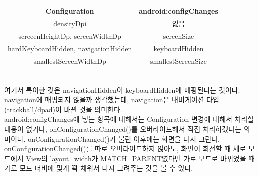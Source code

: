 \begin{tabular}{|c|c|}\hline
Configuration & android:configChanges \\ \hline
densityDpi & 없음 \\ \hline
screeenHeightDp, screenWidthDp & screenSize \\ \hline
hardKeyboardHidden, navigationHidden  & keyboardHidden  \\ \hline
smallestScreenWidthDp & smallestScreenSize \\ \hline
\end{tabular}\\

여기서 특이한 것은 navigationHidden이 keyboardHidden에 매핑된다는 것이다. 
navigation에 매핑되지 않을까 생각했는데, navigation은 내비게이션 타입(trackball/dpad)이 바뀐 것을 의미한다.\\

android:configChanges에 넣는 항목에 대해서는 Configuration 변경에 대해서 처리할 내용이 없거나, onConfigurationChanged()를 오버라이드해서 직접 처리하겠다는 의미이다. onConfigurationChanged()가 불린 이후에는 화면을 다시 그린다. onConfigurationChanged()를 따로 오버라이드하지 않아도, 화면이 회전할 때 세로 모드에서 View의 layout\_width가 MATCH\_PARENT였다면 가로 모드로 바뀌었을 때 가로 모드 너비에 맞게 꽉 채워서 다시 그려주는 것을 볼 수 있다.\\

